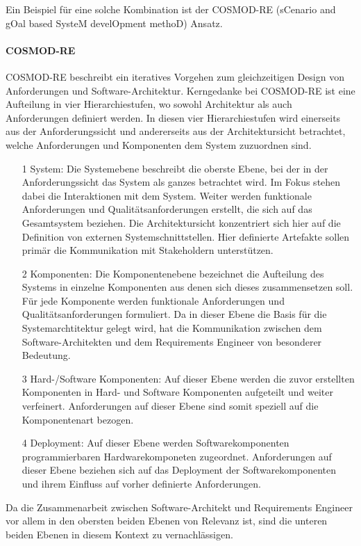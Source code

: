 Ein Beispiel für eine solche Kombination ist der COSMOD-RE (sCenario and gOal based SysteM develOpment methoD) Ansatz. \\

\paragraph{COSMOD-RE}
COSMOD-RE beschreibt ein iteratives Vorgehen zum gleichzeitigen Design von Anforderungen und Software-Architektur. Kerngedanke bei COSMOD-RE ist eine Aufteilung in vier Hierarchiestufen, wo sowohl Architektur als auch Anforderungen definiert werden. In diesen vier Hierarchiestufen wird einerseits aus der Anforderungssicht und andererseits aus der Architektursicht betrachtet, welche Anforderungen und Komponenten dem System zuzuordnen sind.
\begin{itemize}
\item[1] System: Die Systemebene beschreibt die oberste Ebene, bei der in der Anforderungssicht das System als ganzes betrachtet wird. Im Fokus stehen dabei die Interaktionen mit dem System. Weiter werden funktionale Anforderungen und Qualitätsanforderungen erstellt, die sich auf das Gesamtsystem beziehen. Die Architektursicht konzentriert sich hier auf die Definition von externen Systemschnittstellen. Hier definierte Artefakte sollen primär die Kommunikation mit Stakeholdern unterstützen.
\item[2] Komponenten: Die Komponentenebene bezeichnet die Aufteilung des Systems in einzelne Komponenten aus denen sich dieses zusammensetzen soll. Für jede Komponente werden funktionale Anforderungen und Qualitätsanforderungen formuliert. Da in dieser Ebene die Basis für die Systemarchtitektur gelegt wird, hat die Kommunikation zwischen dem Software-Architekten und dem Requirements Engineer von besonderer Bedeutung. 
\item[3] Hard-/Software Komponenten: Auf dieser Ebene werden die zuvor erstellten Komponenten in Hard- und Software Komponenten aufgeteilt und weiter verfeinert. Anforderungen auf dieser Ebene sind somit speziell auf die Komponentenart bezogen. 
\item[4] Deployment: Auf dieser Ebene werden Softwarekomponenten programmierbaren Hardwarekomponeten zugeordnet. Anforderungen auf dieser Ebene beziehen sich auf das Deployment der Softwarekomponenten und ihrem Einfluss auf vorher definierte Anforderungen. 
\end{itemize}
Da die Zusammenarbeit zwischen Software-Architekt und Requirements Engineer vor allem in den obersten beiden Ebenen von Relevanz ist, sind die unteren beiden Ebenen in diesem Kontext zu vernachlässigen.\\

